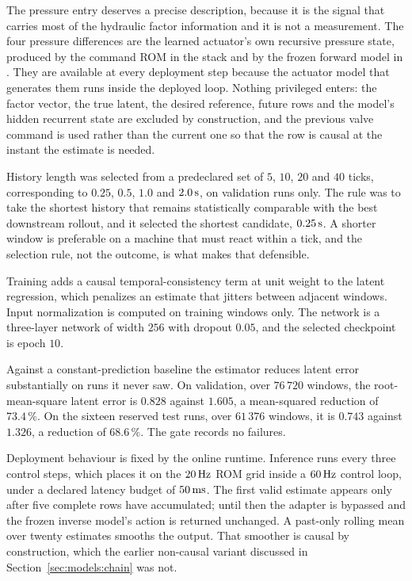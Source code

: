 The pressure entry deserves a precise description, because it is the signal
that carries most of the hydraulic factor information and it is not a
measurement. The four pressure differences are the learned actuator's own
recursive pressure state, produced by the command ROM in the \ppoROM{} stack
and by the frozen forward model in \ppoIDAAMFD{}. They are available at every
deployment step because the actuator model that generates them runs inside the
deployed loop. Nothing privileged enters: the factor vector, the true latent,
the desired reference, future rows and the model's hidden recurrent state are
excluded by construction, and the previous valve command is used rather than
the current one so that the row is causal at the instant the estimate is
needed.

History length was selected from a predeclared set of $5$, $10$, $20$ and $40$
ticks, corresponding to $0.25$, $0.5$, $1.0$ and $\unit[2.0]{s}$, on validation
runs only. The rule was to take the shortest history that remains
statistically comparable with the best downstream rollout, and it selected the
shortest candidate, $\unit[0.25]{s}$. A shorter window is preferable on a
machine that must react within a tick, and the selection rule, not the outcome,
is what makes that defensible.

Training adds a causal temporal-consistency term at unit weight to the latent
regression, which penalizes an estimate that jitters between adjacent windows.
Input normalization is computed on training windows only. The network is a
three-layer network of width $256$ with dropout $0.05$, and the selected
checkpoint is epoch $10$.

Against a constant-prediction baseline the estimator reduces latent error
substantially on runs it never saw. On validation, over $76\,720$ windows,
the root-mean-square latent error is $0.828$ against $1.605$, a mean-squared
reduction of $73.4\,\%$. On the sixteen reserved test runs, over $61\,376$
windows, it is $0.743$ against $1.326$, a reduction of $68.6\,\%$. The gate
records no failures.

Deployment behaviour is fixed by the online runtime. Inference runs every
three control steps, which places it on the $\unit[20]{Hz}$ ROM grid inside a
$\unit[60]{Hz}$ control loop, under a declared latency budget of
$\unit[50]{ms}$. The first valid estimate appears only after five complete
rows have accumulated; until then the adapter is bypassed and the frozen
inverse model's action is returned unchanged. A past-only rolling mean over
twenty estimates smooths the output. That smoother is causal by construction,
which the earlier non-causal variant discussed in
Section~\ref{sec:models:chain} was not.


